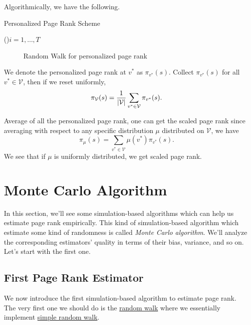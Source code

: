 Algorithmically, we have the following.

\begin{algorithm}[H]\label{algo:personalized-page-rank-scheme}
	\DontPrintSemicolon
	\caption{Personalized Page Rank Scheme}
	\BlankLine

	\For(){\(i = 1, \ldots, T\)}{
	}
	\Return{}\;
\end{algorithm}
\begin{figure}[H]
	\centering
	\caption{Random Walk for personalized page rank}
	\label{fig:personalized-pagerank}
\end{figure}

We denote the personalized page rank at \(v^{\ast} \) as \(\pi_{v^{\ast}}(s)\). Collect \(\pi_{v^{\ast}}(s)\) for all \(v^{\ast}\in\mathcal{V}\), then if we reset uniformly,
\[
	\pi_{\mathcal{\MakeUppercase{v}}} (s) = \frac{1}{\left\vert \mathcal{\MakeUppercase{v}} \right\vert }\sum\limits_{v^{\ast}\in\mathcal{V}} \pi_{v^{\ast}}(s).
\]

\begin{remark}
	Average of all the personalized page rank, one can get the scaled page rank since averaging with respect to any specific distribution \(\mu\) distributed on \(\mathcal{V}\), we have
	\[
		\pi_\mu(s) = \sum\limits_{v^{\ast}\in \mathcal{V}} \mu(v^{\ast})\pi_{v^{\ast}}(s).
	\]
	We see that if \(\mu\) is uniformly distributed, we get scaled page rank.
\end{remark}

\section{Monte Carlo Algorithm}
In this section, we'll see some simulation-based algorithms which can help us estimate page rank empirically. This kind of simulation-based algorithm which estimate some kind of randomness is called \emph{Monte Carlo algorithm}. We'll analyze the corresponding estimators' quality in terms of their bias, variance, and so on. Let's start with the first one.

\subsection{First Page Rank Estimator}
We now introduce the first simulation-based algorithm to estimate page rank. The very first one we should do is the \hyperref[algo:random-walk-algorithm]{random walk} where we essentially implement \hyperref[def:simple-random-walk]{simple random walk}.

